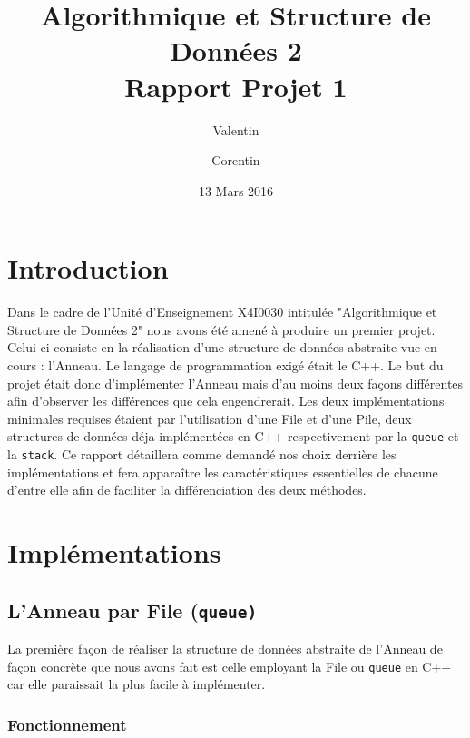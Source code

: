 \documentclass{article}
\title{Algorithmique et Structure de Données 2\\
Rapport Projet 1}
\author{Valentin \bsc{Hénique} \and Corentin \bsc{Chédotal}}
\date{13 Mars 2016}
\newcommand{\info}{\texttt}
\begin{document}
\maketitle

\section{Introduction}

Dans le cadre de l'Unité d'Enseignement X4I0030 intitulée "Algorithmique et Structure de Données 2" nous avons été amené à produire un premier projet. Celui-ci consiste en la réalisation d'une structure de données abstraite vue en cours : l'Anneau. Le langage de programmation exigé était le C++. Le but du projet était donc d'implémenter l'Anneau mais d'au moins deux façons différentes afin d'observer les différences que cela engendrerait. Les deux implémentations minimales requises étaient par l'utilisation d'une File et d'une Pile, deux structures de données déja implémentées en C++ respectivement par la \info{queue} et la \info{stack}. Ce rapport détaillera comme demandé nos choix derrière les implémentations et fera apparaître les caractéristiques essentielles de chacune d'entre elle afin de faciliter la différenciation des deux méthodes.

\section{Implémentations}

    \subsection{L'Anneau par File (\info{queue)}}
    
    La première façon de réaliser la structure de données abstraite de l'Anneau de façon concrète que nous avons fait est celle employant la File ou \info{queue} en C++ car elle paraissait la plus facile à implémenter.
    
        \subsubsection{Fonctionnement}
        
\end{document}
